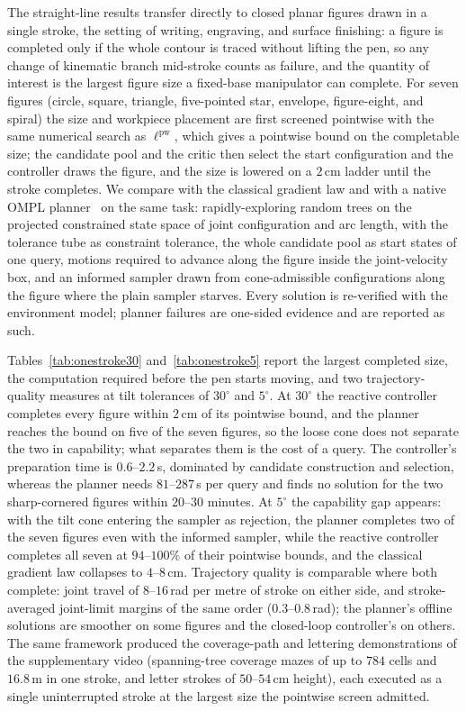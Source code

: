 \documentclass[journal, twoside]{IEEEtran}
\begin{document}
The straight-line results transfer directly to closed planar figures
drawn in a single stroke, the setting of writing, engraving, and surface
finishing: a figure is completed only if the whole contour is traced
without lifting the pen, so any change of kinematic branch mid-stroke
counts as failure, and the quantity of interest is the largest figure
size a fixed-base manipulator can complete. For seven figures (circle,
square, triangle, five-pointed star, envelope, figure-eight, and spiral)
the size and workpiece placement are first screened pointwise with the
same numerical search as $\ell^{\mathrm{pw}}$, which gives a pointwise
bound on the completable size; the candidate pool and the critic then
select the start configuration and the controller draws the figure, and
the size is lowered on a $2$\,cm ladder until the stroke completes. We
compare with the classical gradient law and with a native OMPL
planner~\cite{sucan2012ompl} on the same task: rapidly-exploring random
trees on the projected constrained state space of joint configuration
and arc length, with the tolerance tube as constraint tolerance, the
whole candidate pool as start states of one query, motions required to
advance along the figure inside the joint-velocity box, and an informed
sampler drawn from cone-admissible configurations along the figure where
the plain sampler starves. Every solution is re-verified with the
environment model; planner failures are one-sided evidence and are
reported as such.

Tables~\ref{tab:onestroke30} and~\ref{tab:onestroke5} report the largest
completed size, the computation required before the pen starts moving,
and two trajectory-quality measures at tilt tolerances of $30^\circ$ and
$5^\circ$. At $30^\circ$ the reactive controller completes every figure
within $2$\,cm of its pointwise bound, and the planner reaches the bound
on five of the seven figures, so the loose cone does not separate the two
in capability; what separates them is the cost of a query. The
controller's preparation time is $0.6$--$2.2$\,s, dominated by candidate
construction and selection, whereas the planner needs $81$--$287$\,s per
query and finds no solution for the two sharp-cornered figures within
$20$--$30$ minutes. At $5^\circ$ the capability gap appears: with the
tilt cone entering the sampler as rejection, the planner completes two
of the seven figures even with the informed sampler, while the reactive
controller completes all seven at $94$--$100\%$ of their pointwise
bounds, and the classical gradient law collapses to $4$--$8$\,cm.
Trajectory quality is comparable where both complete: joint travel of
$8$--$16$\,rad per metre of stroke on either side, and stroke-averaged
joint-limit margins of the same order ($0.3$--$0.8$\,rad); the planner's
offline solutions are smoother on some figures and the closed-loop
controller's on others. The same framework produced the coverage-path
and lettering demonstrations of the supplementary video (spanning-tree
coverage mazes of up to $784$ cells and $16.8$\,m in one stroke, and
letter strokes of $50$--$54$\,cm height), each executed as a single
uninterrupted stroke at the largest size the pointwise screen admitted.
\end{document}
